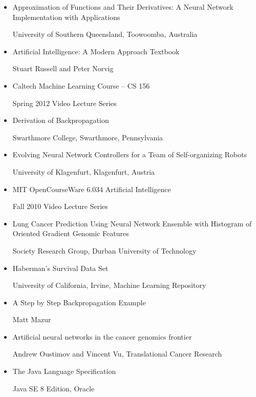 \documentclass[letterpaper, 10pt]{article}
\begin{document}
	\begin{itemize}		
		\item Approximation of Functions and Their Derivatives: A Neural Network Implementation with Applications
		
			\hspace{1.5cm} University of Southern Queensland, Toowoomba, Australia
		\item Artificial Intelligence: A Modern Approach Textbook
			
			\hspace{1.5cm} Stuart Russell and Peter Norvig
		\item Caltech Machine Learning Course -- CS 156
		
			\hspace{1.5cm} Spring 2012 Video Lecture Series
		\item Derivation of Backpropagation
			
			\hspace{1.5cm} Swarthmore College, Swarthmore, Pennsylvania
			
		\item Evolving Neural Network Controllers for a Team of Self-organizing Robots
			
			\hspace{1.5cm} University of Klagenfurt, Klagenfurt, Austria
			
		\item MIT OpenCourseWare 6.034 Artificial Intelligence
			
			\hspace{1.5cm} Fall 2010 Video Lecture Series				
		
		\item Lung Cancer Prediction Using Neural Network Ensemble with Histogram of Oriented Gradient Genomic Features
			
			\hspace{1.5cm} Society Research Group, Durban University of Technology
			
		\item Haberman's Survival Data Set
			
			\hspace{1.5cm} University of California, Irvine, Machine Learning Repository
			
		\item A Step by Step Backpropagation Example
			
			\hspace{1.5cm} Matt Mazur
		
		\item Artificial neural networks in the cancer genomics frontier
			
			\hspace{1.5cm} Andrew Oustimov and Vincent Vu, Translational Cancer Research
			
		\item The Java Language Specification
			
			\hspace{1.5cm} Java SE 8 Edition, Oracle
	\end{itemize}
\end{document}
